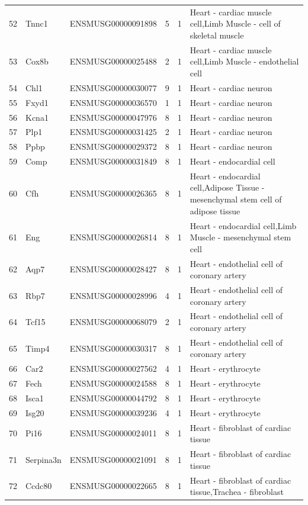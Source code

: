 \begin{table}[ht]
{\begin{tabular}{lllrrl}
        52 & Tnnc1 & ENSMUSG00000091898 & 5 & 1 & Heart - cardiac muscle cell,Limb Muscle - cell of skeletal muscle \\
        53 & Cox8b & ENSMUSG00000025488 & 2 & 1 & Heart - cardiac muscle cell,Limb Muscle - endothelial cell \\
        54 & Chl1 & ENSMUSG00000030077 & 9 & 1 & Heart - cardiac neuron \\
        55 & Fxyd1 & ENSMUSG00000036570 & 1 & 1 & Heart - cardiac neuron \\
        56 & Kcna1 & ENSMUSG00000047976 & 8 & 1 & Heart - cardiac neuron \\
        57 & Plp1 & ENSMUSG00000031425 & 2 & 1 & Heart - cardiac neuron \\
        58 & Ppbp & ENSMUSG00000029372 & 8 & 1 & Heart - cardiac neuron \\
        59 & Comp & ENSMUSG00000031849 & 8 & 1 & Heart - endocardial cell \\
        60 & Cfh & ENSMUSG00000026365 & 8 & 1 & Heart - endocardial cell,Adipose Tissue - mesenchymal stem cell of adipose tissue \\
        61 & Eng & ENSMUSG00000026814 & 8 & 1 & Heart - endocardial cell,Limb Muscle - mesenchymal stem cell \\
        62 & Aqp7 & ENSMUSG00000028427 & 8 & 1 & Heart - endothelial cell of coronary artery \\
        63 & Rbp7 & ENSMUSG00000028996 & 4 & 1 & Heart - endothelial cell of coronary artery \\
        64 & Tcf15 & ENSMUSG00000068079 & 2 & 1 & Heart - endothelial cell of coronary artery \\
        65 & Timp4 & ENSMUSG00000030317 & 8 & 1 & Heart - endothelial cell of coronary artery \\
        66 & Car2 & ENSMUSG00000027562 & 4 & 1 & Heart - erythrocyte \\
        67 & Fech & ENSMUSG00000024588 & 8 & 1 & Heart - erythrocyte \\
        68 & Isca1 & ENSMUSG00000044792 & 8 & 1 & Heart - erythrocyte \\
        69 & Isg20 & ENSMUSG00000039236 & 4 & 1 & Heart - erythrocyte \\
        70 & Pi16 & ENSMUSG00000024011 & 8 & 1 & Heart - fibroblast of cardiac tissue \\
        71 & Serpina3n & ENSMUSG00000021091 & 8 & 1 & Heart - fibroblast of cardiac tissue \\
        72 & Ccdc80 & ENSMUSG00000022665 & 8 & 1 & Heart - fibroblast of cardiac tissue,Trachea - fibroblast \\

\end{tabular}}
\end{table}

